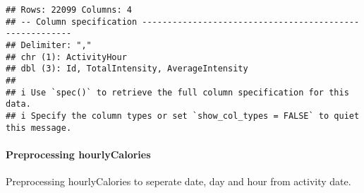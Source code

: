 \documentclass[
]{article}
\newenvironment{Shaded}{\begin{snugshade}}{\end{snugshade}}
\newcommand{\AttributeTok}[1]{\textcolor[rgb]{0.77,0.63,0.00}{#1}}
\newcommand{\FunctionTok}[1]{\textcolor[rgb]{0.00,0.00,0.00}{#1}}
\newcommand{\NormalTok}[1]{#1}
\newcommand{\OtherTok}[1]{\textcolor[rgb]{0.56,0.35,0.01}{#1}}
\newcommand{\SpecialCharTok}[1]{\textcolor[rgb]{0.00,0.00,0.00}{#1}}
\newcommand{\StringTok}[1]{\textcolor[rgb]{0.31,0.60,0.02}{#1}}
\begin{document}
\begin{verbatim}
## Rows: 22099 Columns: 4
## -- Column specification --------------------------------------------------------
## Delimiter: ","
## chr (1): ActivityHour
## dbl (3): Id, TotalIntensity, AverageIntensity
## 
## i Use `spec()` to retrieve the full column specification for this data.
## i Specify the column types or set `show_col_types = FALSE` to quiet this message.
\end{verbatim}

\hypertarget{preprocessing-hourlycalories}{%
\paragraph{Preprocessing
hourlyCalories}\label{preprocessing-hourlycalories}}

Preprocessing hourlyCalories to seperate date, day and hour from
activity date.

\begin{Shaded}
\end{Shaded}
\end{document}
